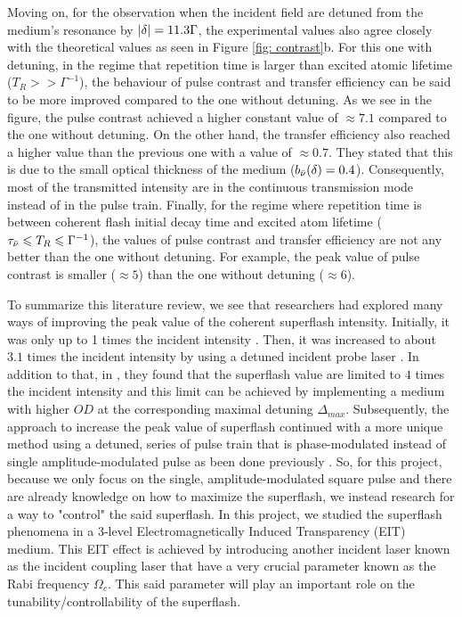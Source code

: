 Moving on, for the observation when the incident field are detuned from the medium's resonance by $\abs{\delta} = 11.3 \Gamma$, the experimental values also agree closely with the theoretical values as seen in Figure \ref{fig: contrast}b. For this one with detuning, in the regime that repetition time is larger than excited atomic lifetime ($T_{R} >> \Gamma^{-1}$), the behaviour of pulse contrast and transfer efficiency can be said to be more improved compared to the one without detuning. As we see in the figure, the pulse contrast achieved a higher constant value of $\approx 7.1$ compared to the one without detuning. On the other hand, the transfer efficiency also reached a higher value than the previous one with a value of $\approx 0.7$. They stated that this is due to the small optical thickness of the medium ($b_{\Bar{\nu}}(\delta) = 0.4$). Consequently, most of the transmitted intensity are in the continuous transmission mode instead of in the pulse train. Finally, for the regime where repetition time is between coherent flash initial decay time and excited atom lifetime ($\tau_{\Bar{\nu}} \leqslant T_{R} \leqslant \Gamma^{-1}$), the values of pulse contrast and transfer efficiency are not any better than the one without detuning. For example, the peak value of pulse contrast is smaller ($\approx 5$) than the one without detuning ($\approx 6$).

To summarize this literature review, we see that researchers had explored many ways of improving the peak value of the coherent superflash intensity. Initially, it was only up to 1 times the incident intensity \cite{Chalony2011}. Then, it was increased to about $3.1$ times the incident intensity by using a detuned incident probe laser \cite{Kwong2014}. In addition to that, in \cite{Kwong2014}, they found that the superflash value are limited to $4$ times the incident intensity and this limit can be achieved by implementing a medium with higher $OD$ at the corresponding maximal detuning $\Delta_{max}$. Subsequently, the approach to increase the peak value of superflash continued with a more unique method using a detuned, series of pulse train that is phase-modulated \cite{Kwong2015} instead of single amplitude-modulated pulse as been done previously \cite{Chalony2011, Kwong2014}. So, for this project, because we only focus on the single, amplitude-modulated square pulse and there are already knowledge on how to maximize the superflash, we instead research for a way to "control" the said superflash. In this project, we studied the superflash phenomena in a 3-level Electromagnetically Induced Transparency (EIT) medium. This EIT effect is achieved by introducing another incident laser known as the incident coupling laser that have a very crucial parameter known as the Rabi frequency $\Omega_{c}$. This said parameter will play an important role on the tunability/controllability of the superflash.
